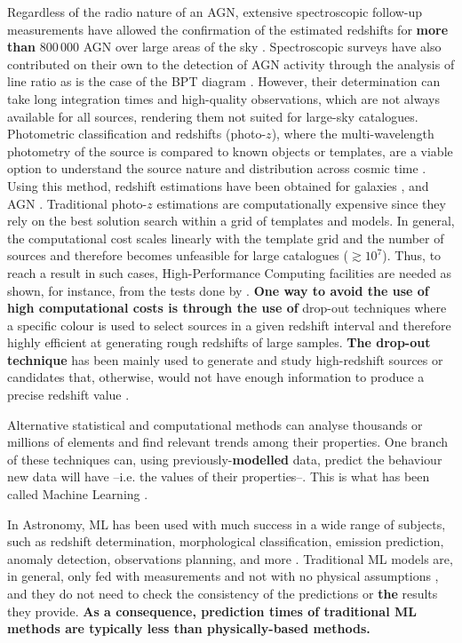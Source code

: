 \documentclass{aa}
\begin{document}
Regardless of the radio nature of an AGN, extensive spectroscopic follow-up measurements have allowed the confirmation of the estimated redshifts for \textbf{more than} $800\,000$ AGN over large areas of the sky \citep{2021arXiv210512985F}. Spectroscopic surveys have also contributed on their own to the detection of AGN activity through the analysis of line ratio as is the case of the BPT diagram \citep*{1981PASP...93....5B}. However, their determination can take long integration times and high-quality observations, which are not always available for all sources, rendering them not suited for large-sky catalogues. Photometric classification and redshifts (photo-$z$), where the multi-wavelength photometry of the source is compared to known objects or templates, are a viable option to understand the source nature and distribution across cosmic time \citep{1957AJ.....62....6B, 2019NatAs...3..212S}. Using this method, redshift estimations have been obtained for galaxies \citep[e.g.][]{2021A&A...654A.101H}, and AGN \citep[e.g.][]{2017ApJ...850...66A}. Traditional photo-$z$ estimations are computationally expensive since they rely on the best solution search within a grid of templates and models. In general, the computational cost scales linearly with the template grid and the number of sources and therefore becomes unfeasible for large catalogues (${\gtrsim}10^{7}$). Thus, to reach a result in such cases, High-Performance Computing facilities are needed as shown, for instance, from the tests done by \citet{2021ApJ...916...43G}. \textbf{One way to avoid the use of high computational costs is through the use of} drop-out techniques where a specific colour is used to select sources in a given redshift interval and therefore highly efficient at generating rough redshifts of large samples. \textbf{The drop-out technique} has been mainly used to generate and study high-redshift sources or candidates that, otherwise, would not have enough information to produce a precise redshift value \citep[e.g.][]{2020ApJ...902..112B, 2020A&A...633A.160C, 2022arXiv221106915S}.

Alternative statistical and computational methods can analyse thousands or millions of elements and find relevant trends among their properties. One branch of these techniques can, using previously-\textbf{modelled} data, predict the behaviour new data will have --i.e. the values of their properties--. This is what has been called Machine Learning \citep[ML;][]{5392560}.

In Astronomy, ML has been used with much success in a wide range of subjects, such as redshift determination, morphological classification, emission prediction, anomaly detection, observations planning, and more \citep[\textbf{e.g.}][]{2010IJMPD..19.1049B, 2019arXiv190407248B}. Traditional ML models are, in general, only fed with measurements and not with no physical assumptions \citep{Desai2021}, and they do not need to check the consistency of the predictions or \textbf{the} results they provide. \textbf{As a consequence, prediction times of traditional ML methods are typically less than physically-based methods.}
\end{document}
